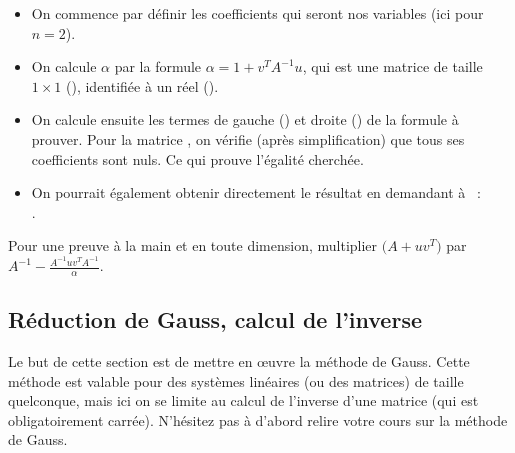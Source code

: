 \documentclass[class=report,crop=false]{standalone}
\begin{document}
 
\begin{itemize}
  \item On commence par définir les coefficients qui seront nos 
	  variables (ici pour $n=2$).

  
  \item On calcule $\alpha$ par la formule $\alpha = 1 + v^T A^{-1} u$,
qui est une matrice de taille $1\times1$ (), 
identifiée à un réel ().
  
  \item On calcule ensuite les termes de gauche ()
et droite () de la formule à prouver.
Pour la matrice , on vérifie (après simplification) que tous ses coefficients sont nuls.
Ce qui prouve l'égalité cherchée.

  \item On pourrait également obtenir directement le résultat en demandant à \Sage\ : \\  
  .
\end{itemize}


Pour une preuve à la main et en toute dimension, multiplier 
$\big(A+u v^T\big)$ par $A^{-1} - \frac{A^{-1}u v^T A^{-1}}{\alpha}$.

\subsection{Réduction de Gauss, calcul de l'inverse}


Le but de cette section est de mettre en \oe uvre la méthode de Gauss.
Cette méthode est valable pour des systèmes linéaires (ou des matrices) de taille quelconque, 
mais ici on se limite au calcul de l'inverse d'une matrice (qui est obligatoirement carrée). 
N'hésitez pas à d'abord relire votre cours sur la méthode de Gauss.
\end{document}
